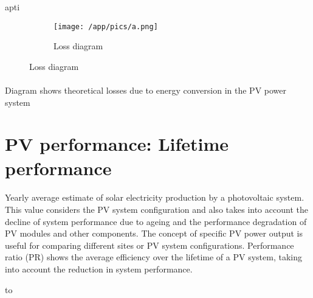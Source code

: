 apti     \documentclass[10pt,a4paper,UTF8]{article}
\begin{document}
{%
\begin{figure}[H]  %
    
    \begin{figure}[H]
    \vspace*{-5mm}
    \caption{ Loss diagram }
    \texttt{[image: /app/pics/a.png]}
    \end{figure}
    
\end{figure}\paragraph{} Diagram shows theoretical losses due to energy conversion in the PV power system\newpage{}
\section{ PV performance: Lifetime performance }
\setcounter{figure}{0}
\setcounter{table}{0}

\paragraph{} Yearly average estimate of solar electricity production by a photovoltaic system. This value considers the PV system configuration and also takes into account the decline of system performance due to ageing and the performance degradation of PV modules and other components. The concept of specific PV power output is useful for comparing different sites or PV system configurations. Performance ratio (PR) shows the average efficiency over the lifetime of a PV system, taking into account the reduction in system performance.%


%


 {\footnotesize 

     \begin{longtabu} to \textwidth{ X[1,L]X[1,R]X[1,R]X[1,R]X[1,R] }
    

\end{longtabu}}}
\end{document}
